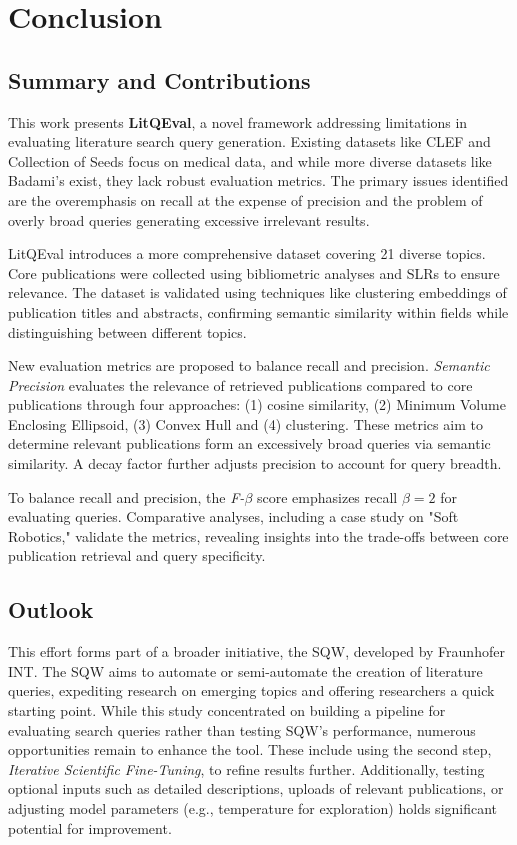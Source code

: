 {\let\clearpage\relax \chapter{Conclusion}\label{ch:conclusion}}

\section{Summary and Contributions}
This work presents \textbf{LitQEval}, a novel framework addressing limitations in evaluating literature search query generation. Existing datasets like CLEF and Collection of Seeds focus on medical data, and while more diverse datasets like Badami’s \autocite{badami2023adaptive} exist, they lack robust evaluation metrics. The primary issues identified are the overemphasis on recall at the expense of precision and the problem of overly broad queries generating excessive irrelevant results. 

LitQEval introduces a more comprehensive dataset covering 21 diverse topics. Core publications were collected using bibliometric analyses and SLRs to ensure relevance. The dataset is validated using techniques like clustering embeddings of publication titles and abstracts, confirming semantic similarity within fields while distinguishing between different topics.

New evaluation metrics are proposed to balance recall and precision. \textit{Semantic Precision} evaluates the relevance of retrieved publications compared to core publications through four approaches: (1) cosine similarity, (2) Minimum Volume Enclosing Ellipsoid, (3) Convex Hull and (4) clustering. These metrics aim to determine relevant publications form an excessively broad queries via semantic similarity. A decay factor further adjusts precision to account for query breadth.

To balance recall and precision, the \textit{ F-$\beta$ }score emphasizes recall $\beta=2$ for evaluating queries. Comparative analyses, including a case study on "Soft Robotics," validate the metrics, revealing insights into the trade-offs between core publication retrieval and query specificity.

\section{Outlook}
This effort forms part of a broader initiative, the SQW, developed by Fraunhofer INT. The SQW aims to automate or semi-automate the creation of literature queries, expediting research on emerging topics and offering researchers a quick starting point. While this study concentrated on building a pipeline for evaluating search queries rather than testing SQW's performance, numerous opportunities remain to enhance the tool. These include using the second step, \textit{Iterative Scientific Fine-Tuning}, to refine results further. Additionally, testing optional inputs such as detailed descriptions, uploads of relevant publications, or adjusting model parameters (e.g., temperature for exploration) holds significant potential for improvement.

